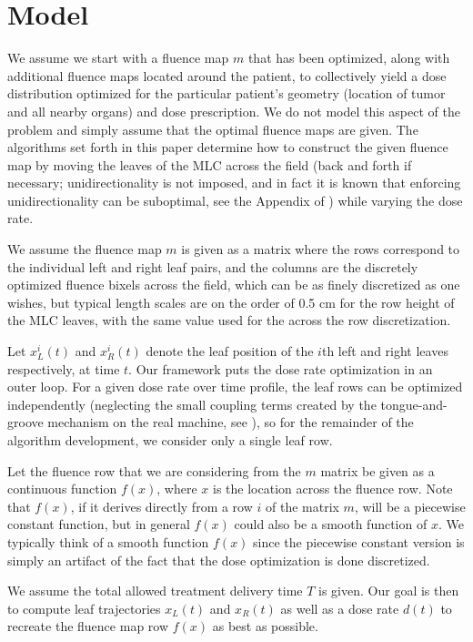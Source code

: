 \documentclass[12pt]{article}
\begin{document}
\section{Model}
We assume we start with a fluence map $m$
that has been optimized, along with additional fluence maps located around the patient, to collectively yield a dose distribution optimized for the particular patient's geometry (location of tumor and all nearby organs) and dose prescription. We do not model this aspect of the problem and simply assume that the optimal fluence maps are given. The algorithms set forth in this paper determine how to construct the given fluence map by moving the leaves of the MLC across the field (back and forth if necessary; unidirectionality is not imposed, and in fact it is known that enforcing unidirectionality can be suboptimal, see the Appendix of \cite{balvertcraft}) while varying the dose rate.

We assume the fluence map $m$ is given as a matrix where the rows correspond to the individual left and right leaf pairs, and the columns are the discretely optimized fluence bixels across the field, which can be as finely discretized as one wishes, but typical length scales are on the order of 0.5 cm for the row height of the MLC leaves, with the same value used for the across the row discretization. 

Let $x^i_L(t)$ and $x^i_R(t)$ denote the leaf position of the $i$th left and right leaves respectively, at time $t$.
Our framework puts the dose rate optimization in an outer loop. For a given dose rate over time profile, the leaf rows can be optimized independently (neglecting the small coupling terms created by the tongue-and-groove mechanism on the real machine, see \cite{unkvmatreview}), so for the remainder of the algorithm development, we consider only a single leaf row.

Let the fluence row that we are considering from the $m$ matrix be given as a continuous function $f(x)$, where $x$ is the location across the fluence row. Note that $f(x)$, if it derives directly from a row $i$ of the matrix $m$, will be a piecewise constant function, but in general $f(x)$ could also be a smooth function of $x$. We typically think of a smooth function $f(x)$ since the piecewise constant version is simply an artifact of the fact that the dose optimization is done discretized.

We assume the total allowed treatment delivery time $T$ is given. Our goal is then to compute leaf trajectories $x_L(t)$ and $x_R(t)$ as well as a dose rate $d(t)$ to recreate the fluence map row $f(x)$ as best as possible.
\end{document}
